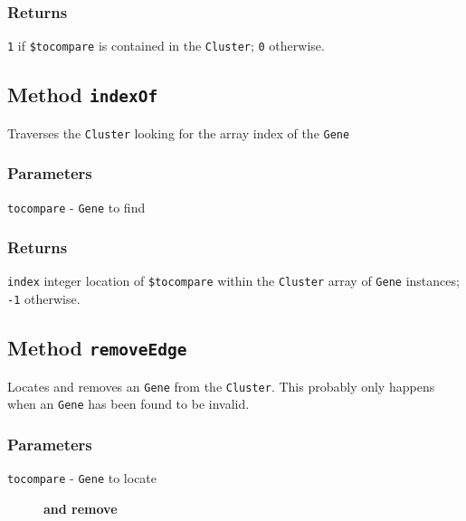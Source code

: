 \subsubsection*{Returns\label{Returns}}


\texttt{1} if \texttt{\$tocompare} is contained in the \texttt{Cluster}; \texttt{0} otherwise.

\subsection*{Method \texttt{indexOf}\label{Method_indexOf}}


Traverses the \texttt{Cluster} looking for the array index of the \texttt{Gene}

\subsubsection*{Parameters\label{Parameters}}
\begin{description}

\item[{\texttt{tocompare} - \texttt{Gene} to find}] \mbox{}\end{description}
\subsubsection*{Returns\label{Returns}}


\texttt{index} integer location of \texttt{\$tocompare} within the \texttt{Cluster} array of \texttt{Gene} instances; \texttt{-1} otherwise.

\subsection*{Method \texttt{removeEdge}\label{Method_removeEdge}}


Locates and removes an \texttt{Gene} from the \texttt{Cluster}. This probably only happens
when an \texttt{Gene} has been found to be invalid.

\subsubsection*{Parameters\label{Parameters}}
\begin{description}

\item[{\texttt{tocompare} - \texttt{Gene} to locate}] \textbf{and remove}\end{description}
